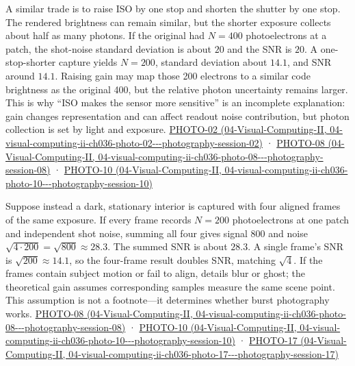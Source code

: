 A similar trade is to raise ISO by one stop and shorten the shutter by one stop. The rendered brightness can remain similar, but the shorter exposure collects about half as many photons. If the original had \(N=400\) photoelectrons at a patch, the shot-noise standard deviation is about \(20\) and the SNR is \(20\). A one-stop-shorter capture yields \(N=200\), standard deviation about \(14.1\), and SNR around \(14.1\). Raising gain may map those 200 electrons to a similar code brightness as the original 400, but the relative photon uncertainty remains larger. This is why ``ISO makes the sensor more sensitive'' is an incomplete explanation: gain changes representation and can affect readout noise contribution, but photon collection is set by light and exposure. \href{../04-Visual-Computing-II/main.pdf\#nameddest=04-visual-computing-ii-ch036-photo-02---photography-session-02}{PHOTO-02 (04-Visual-Computing-II, 04-visual-computing-ii-ch036-photo-02-\/-\/-photography-session-02)} · \href{../04-Visual-Computing-II/main.pdf\#nameddest=04-visual-computing-ii-ch036-photo-08---photography-session-08}{PHOTO-08 (04-Visual-Computing-II, 04-visual-computing-ii-ch036-photo-08-\/-\/-photography-session-08)} · \href{../04-Visual-Computing-II/main.pdf\#nameddest=04-visual-computing-ii-ch036-photo-10---photography-session-10}{PHOTO-10 (04-Visual-Computing-II, 04-visual-computing-ii-ch036-photo-10-\/-\/-photography-session-10)}

Suppose instead a dark, stationary interior is captured with four aligned frames of the same exposure. If every frame records \(N=200\) photoelectrons at one patch and independent shot noise, summing all four gives signal \(800\) and noise \(\sqrt{4\cdot200}=\sqrt{800}\approx28.3\). The summed SNR is about \(28.3\). A single frame's SNR is \(\sqrt{200}\approx14.1\), so the four-frame result doubles SNR, matching \(\sqrt4\). If the frames contain subject motion or fail to align, details blur or ghost; the theoretical gain assumes corresponding samples measure the same scene point. This assumption is not a footnote---it determines whether burst photography works. \href{../04-Visual-Computing-II/main.pdf\#nameddest=04-visual-computing-ii-ch036-photo-08---photography-session-08}{PHOTO-08 (04-Visual-Computing-II, 04-visual-computing-ii-ch036-photo-08-\/-\/-photography-session-08)} · \href{../04-Visual-Computing-II/main.pdf\#nameddest=04-visual-computing-ii-ch036-photo-10---photography-session-10}{PHOTO-10 (04-Visual-Computing-II, 04-visual-computing-ii-ch036-photo-10-\/-\/-photography-session-10)} · \href{../04-Visual-Computing-II/main.pdf\#nameddest=04-visual-computing-ii-ch036-photo-17---photography-session-17}{PHOTO-17 (04-Visual-Computing-II, 04-visual-computing-ii-ch036-photo-17-\/-\/-photography-session-17)}


